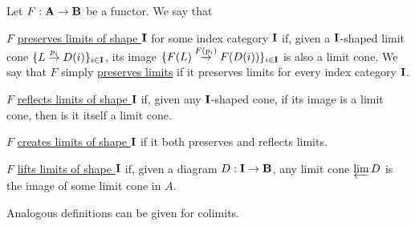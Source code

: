 \begin{definition}\label{def:categorical_limit_preservation}\cite[definitions 5.3.1, 5.3.5]{Leinster2014}
  Let $F: \operatorname{\mathbf{A}} \to \operatorname{\mathbf{B}}$ be a functor. We say that
  \begin{defenum}
    \item\label{def:categorical_limit_preservation/preserve} $F$ \uline{preserves limits of shape $\operatorname{\mathbf{I}}$} for some index category $\operatorname{\mathbf{I}}$ if, given a $\operatorname{\mathbf{I}}$-shaped limit cone \mbox{$\{ L \overset {p_i} \to D(i) \}_{i \in \operatorname{\mathbf{I}}}$}, its image \mbox{$\{ F(L) \overset {F(p_i)} \to F(D(i)) \}_{i \in \operatorname{\mathbf{I}}}$} is also a limit cone. We say that $F$ simply \uline{preserves limits} if it preserves limits for every index category $\operatorname{\mathbf{I}}$.

    \item\label{def:categorical_limit_preservation/reflect} $F$ \uline{reflects limits of shape $\operatorname{\mathbf{I}}$} if, given any $\operatorname{\mathbf{I}}$-shaped cone, if its image is a limit cone, then is it itself a limit cone.

    \item\label{def:categorical_limit_preservation/create} $F$ \uline{creates limits of shape $\operatorname{\mathbf{I}}$} if it both preserves and reflects limits.

    \item\label{def:categorical_limit_preservation/lift} $F$ \uline{lifts limits of shape $\operatorname{\mathbf{I}}$} if, given a diagram $D: \operatorname{\mathbf{I}} \to \operatorname{\mathbf{B}}$, any limit cone $\varprojlim D$ is the image of some limit cone in $A$.
  \end{defenum}
\end{definition}

\begin{note}\label{note:categorical_colimit_preservation}
  Analogous definitions can be given for colimits.
\end{note}
